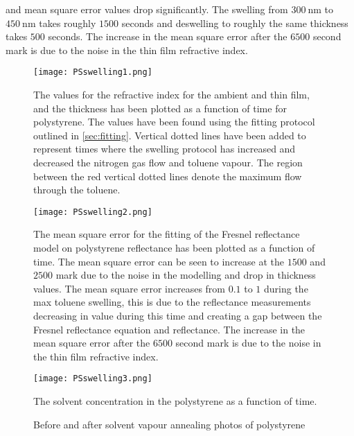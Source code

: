 \documentclass[MasterThesisMain.tex]{subfiles}
\begin{document}
and mean square error values drop significantly. The swelling from $\SI{300}{\nano\meter}$ to $\SI{450}{\nano\meter}$ takes roughly $1500$ seconds and deswelling to roughly the same thickness takes $500$ seconds. The increase in the mean square error after the $6500$ second mark is due to the noise in the thin film refractive index.       

\begin{figure}
\centering
\texttt{[image: PSswelling1.png]}
\caption{The values for the refractive index for the ambient and thin film, and the thickness has been plotted as a function of time for polystyrene. The values have been found using the fitting protocol outlined in \ref{sec:fitting}. Vertical dotted lines have been added to represent times where the swelling protocol has increased and decreased the nitrogen gas flow and toluene vapour. The region between the red vertical dotted lines denote the maximum flow through the toluene.}
\label{fig:PSswelling1}
\end{figure}


\begin{figure}
\centering
\texttt{[image: PSswelling2.png]}
\caption{The mean square error for the fitting of the Fresnel reflectance model on polystyrene reflectance has been plotted as a function of time. The mean square error can be seen to increase at the $1500$ and $2500$ mark due to the noise in the modelling and drop in thickness values. The mean square error increases from $0.1$ to $1$ during the max toluene swelling, this is due to the reflectance measurements decreasing in value during this time and creating a gap between the Fresnel reflectance equation and reflectance. The increase in the mean square error after the $6500$ second mark is due to the noise in the thin film refractive index.}
\label{fig:PSswelling2}
\end{figure}

\begin{figure}
\centering
\texttt{[image: PSswelling3.png]}
\caption{The solvent concentration in the polystyrene as a function of time.}
\label{fig:PSswelling3}
\end{figure}

\begin{figure}
\centering     
{}
\caption{Before and after solvent vapour annealing photos of polystyrene}
\end{figure}
	
\end{document}
